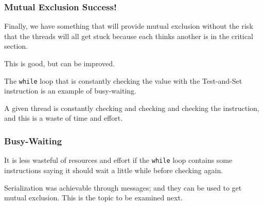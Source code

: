 \begin{frame}
	\frametitle{Mutual Exclusion Success!}

	Finally, we have something that will provide mutual exclusion without the risk that the threads will all get stuck because each thinks another is in the critical section.

	This is good, but can be improved.

	The \texttt{while} loop that is constantly checking the value with the Test-and-Set instruction is an example of \alert{busy-waiting}.

	A given thread is constantly checking and checking and checking the instruction, and this is a waste of time and effort.

\end{frame}

\begin{frame}
	\frametitle{Busy-Waiting}

	It is less wasteful of resources and effort if the \texttt{while} loop contains some instructions saying it should wait a little while before checking again.

	Serialization was achievable through messages; and they can be used to get mutual exclusion. This is the topic to be examined next.


\end{frame}



